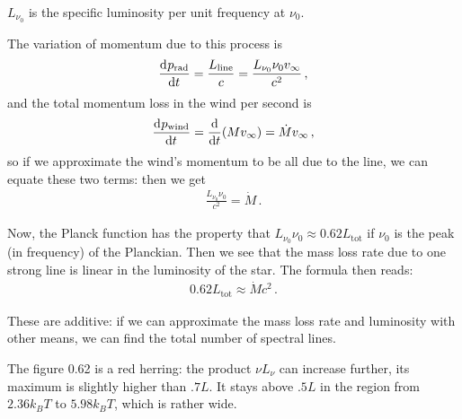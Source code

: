 \documentclass[main.tex]{subfiles}
\begin{document}
\(L_{\nu_0 }\) is the specific luminosity per unit frequency at \(\nu_0 \).

The variation of momentum due to this process is 
%
\begin{align}
  \dv[]{p _{\text{rad}}}{t} = \frac{L _{\text{line}}}{c}
  = \frac{L_{\nu_0 } \nu_0 v_{\infty}}{c^2}
\,,
\end{align}
%
and the total momentum loss in the wind per second is 
%
\begin{align}
\dv[]{p _{\text{wind}}}{t} =
\dv{}{t} \qty(M v_{ \infty }) =
\dot{M} v_{\infty} 
\,,
\end{align}
%
so if we approximate the wind's momentum to be all due to the line, we can equate these two terms: then we get 
%
\begin{align}
  \frac{L_{\nu_0 } \nu_0}{c^2} = \dot{M} 
\,.
\end{align}

Now, the Planck function has the property that \(L_{\nu_0  } \nu_0 \approx 0.62 L _{\text{tot}}\) if \(\nu_0 \) is the peak (in frequency) of the Planckian.
Then we see that the mass loss rate due to one strong line is linear in the luminosity of the star. The formula then reads: 
%
\begin{align}
0.62 L _{\text{tot}} \approx \dot{M} c^2
\,.
\end{align}
%

These are additive: if we can approximate the mass loss rate and luminosity with other means, we can find the total number of spectral lines.

\begin{bluebox}
The figure \num{.62} is a red herring: the product \(\nu L_\nu \) can increase further, its maximum is slightly higher than \(\num{.7}L\). It stays above \(\num{.5}L\) in the region from \(\num{2.36} k_B T\) to \(\num{5.98} k_B T\), which is rather wide.
\end{bluebox}
\end{document}

